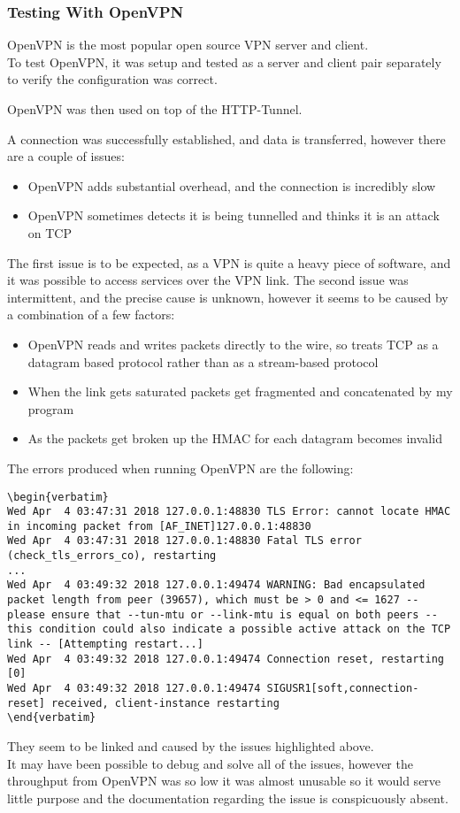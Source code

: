 \subsubsection*{Testing With OpenVPN}
OpenVPN is the most popular open source VPN server and client.\\
To test OpenVPN, it was setup and tested as a server and client pair separately to verify the configuration was correct.\par
OpenVPN was then used on top of the HTTP-Tunnel.\par
A connection was successfully established, and data is transferred, however there are a couple of issues:
\begin{itemize}
    \item OpenVPN adds substantial overhead, and the connection is incredibly slow
    \item OpenVPN sometimes detects it is being tunnelled and thinks it is an attack on TCP
\end{itemize}
The first issue is to be expected, as a VPN is quite a heavy piece of software, and it was possible to access services over the VPN link.
The second issue was intermittent, and the precise cause is unknown, however it seems to be caused by a combination of a few factors:
\begin{itemize}
    \item OpenVPN reads and writes packets directly to the wire, so treats TCP as a datagram based protocol rather than as a stream-based protocol
    \item When the link gets saturated packets get fragmented and concatenated by my program
    \item As the packets get broken up the HMAC for each datagram becomes invalid
\end{itemize}
The errors produced when running OpenVPN are the following:
\begin{lstlisting}[language=none,numbers=none,firstline=2,lastline=7]
\begin{verbatim}
Wed Apr  4 03:47:31 2018 127.0.0.1:48830 TLS Error: cannot locate HMAC in incoming packet from [AF_INET]127.0.0.1:48830
Wed Apr  4 03:47:31 2018 127.0.0.1:48830 Fatal TLS error (check_tls_errors_co), restarting
...
Wed Apr  4 03:49:32 2018 127.0.0.1:49474 WARNING: Bad encapsulated packet length from peer (39657), which must be > 0 and <= 1627 -- please ensure that --tun-mtu or --link-mtu is equal on both peers -- this condition could also indicate a possible active attack on the TCP link -- [Attempting restart...]
Wed Apr  4 03:49:32 2018 127.0.0.1:49474 Connection reset, restarting [0]
Wed Apr  4 03:49:32 2018 127.0.0.1:49474 SIGUSR1[soft,connection-reset] received, client-instance restarting
\end{verbatim}
\end{lstlisting}
They seem to be linked and caused by the issues highlighted above.\\
It may have been possible to debug and solve all of the issues, however the throughput from OpenVPN was so low  it was almost unusable so it would serve little purpose and the documentation regarding the issue is conspicuously absent.

